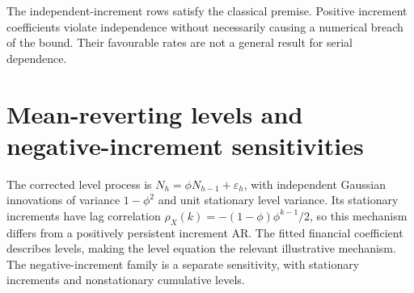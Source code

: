 \documentclass[11pt,a4paper]{article}
\begin{document}
The independent-increment rows satisfy the classical premise.
Positive increment coefficients violate independence without necessarily causing
a numerical breach of the bound. Their favourable rates are not a general
result for serial dependence.\section{Mean-reverting levels and negative-increment sensitivities}\label{sup:simulation-primary}

The corrected level process is
\(N_h=\phi N_{h-1}+\varepsilon_h\), with independent Gaussian innovations
of variance \(1-\phi^2\) and unit stationary level variance. Its stationary
increments have lag correlation
\(\rho_X(k)=-(1-\phi)\phi^{k-1}/2\), so this mechanism differs from a
positively persistent increment AR. The fitted financial coefficient describes
levels, making the level equation the relevant illustrative mechanism.
The negative-increment family is a separate sensitivity, with stationary
increments and nonstationary cumulative levels.
\begingroup
\scriptsize
\setlength{\tabcolsep}{3pt}
\renewcommand{\arraystretch}{1.12}
\end{document}
